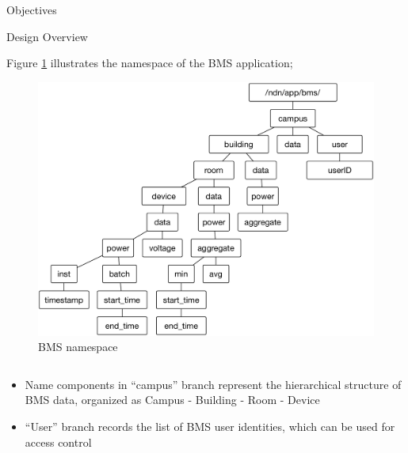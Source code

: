 \documentclass[final,hyperref={pdfpagelabels=false},20pt]{beamer}
\begin{document}
\begin{frame}[t]
\begin{columns}[t]
\begin{column}{.465\textwidth}
\begin{block}{Objectives}

\end{block}


\begin{block}{Design Overview}

Figure \ref{fig:namespace} illustrates the namespace of the BMS application;

\begin{figure}
\includegraphics[width=0.9\linewidth]{bms-namespace}
\caption{BMS namespace}
\label{fig:namespace}
\end{figure}

\begin{columns}[T]

\begin{column}{.42\textwidth}
\begin{itemize}
\item{Name components in ``campus'' branch represent the hierarchical structure of BMS data, organized as Campus - Building - Room - Device}
\item{``User'' branch records the list of BMS user identities, which can be used for access control}
\end{itemize}
\end{column}


\end{columns}
\end{block}
\end{column}
\end{columns}
\end{frame}
\end{document}
